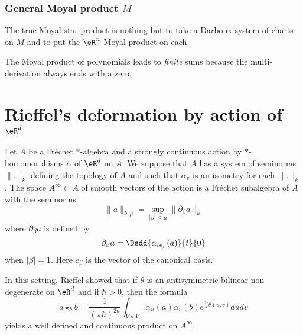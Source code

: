 \subsubsection{General Moyal product \texorpdfstring{$M$}{M}}

The true Moyal star product is nothing but to take a Darboux system of charts on $M$ and to put the $\eR^n$ Moyal product on each.

\begin{remark}
	The Moyal product of polynomials leads to \emph{finite} sums because the multi-derivation always ends with a zero.
\end{remark}

\section{Rieffel's deformation by action of \texorpdfstring{$\eR^d$}{Rd}}

Let $A$ be a Fréchet $*$-algebra and a strongly continuous action by $*$-homomorphisms $\alpha$ of $\eR^d$ on $A$. We suppose that $A$ has a system of seminorms $\| . \|_k$ defining the topology of $A$ and such that $\alpha_v$ is an isometry for each $\| . \|_k$. The space $A^{\infty}\subset A$ of smooth vectors of the action is a Fréchet subalgebra of $A$ with the seminorms
\begin{equation}
	\| a \|_{k,\mu}=\sup_{| \beta |\leq\mu}\| \partial_{\beta}a \|_k
\end{equation}
where $\partial_{\beta}a$ is defined by
\begin{equation}
	\partial_{\beta}a=\Dsdd{ \alpha_{te_{\beta}}(a) }{t}{0}
\end{equation}
when $| \beta |=1$. Here $e_{\beta}$ is the vector of the canonical basis.

In this setting, Rieffel showed that if $\theta$ is an antisymmetric bilinear non degenerate on $\eR^d$ and if $\hbar>0$, then the formula
\begin{equation}
	a\star_{\hbar} b=\frac{1}{ (\pi \hbar)^{2n} }\int_{V\times V}\alpha_u(a)\alpha_v(b) e^{\frac{ 2i }{ \hbar }\theta(u,v)}dudv
\end{equation}
yields a well defined and continuous product on $A^{\infty}$.



